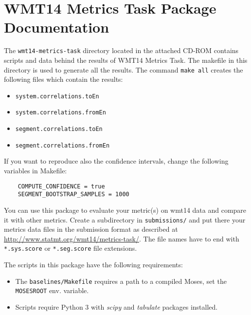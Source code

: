 \appendix
\chapter{WMT14 Metrics Task Package Documentation}

\noindent
The \texttt{wmt14-metrics-task} directory located in the attached CD-ROM
contains scripts and data behind the results of WMT14 Metrics Task. The
makefile in this directory is used to generate all the results. The command
\texttt{make all} creates the following files which contain the results: 

\begin{itemize}
  \item \texttt{system.correlations.toEn}
  \item \texttt{system.correlations.fromEn}
  \item \texttt{segment.correlations.toEn}
  \item \texttt{segment.correlations.fromEn}
\end{itemize}

\noindent
If you want to reproduce also the confidence intervals, change the following
variables in Makefile:

\begin{verbatim}
    COMPUTE_CONFIDENCE = true
    SEGMENT_BOOTSTRAP_SAMPLES = 1000
\end{verbatim}

\noindent
You can use this package to evaluate your metric(s) on wmt14 data and compare
it with other metrics. Create a subdirectory in \texttt{submissions/} and put
there your metrics data files in the submission format as described at
\url{http://www.statmt.org/wmt14/metrics-task/}.  The file names have to end
with \texttt{*.sys.score} or \texttt{*.seg.score} file extensions.

\vspace{0.7cm}
\noindent
The scripts in this package have the following requirements:
 
\begin{itemize}
  \item The \texttt{baselines/Makefile} requires a path to a compiled Moses, set
    the \texttt{MOSESROOT} env. variable.
  \item Scripts require Python 3 with \textit{scipy} and \textit{tabulate} packages installed.
\end{itemize}


